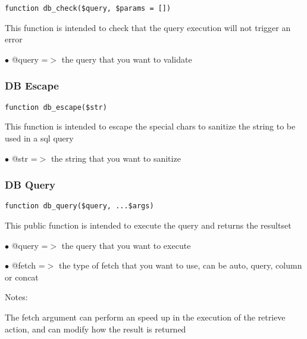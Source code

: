 \documentclass[a4paper]{article}
\begin{document}
\begin{lstlisting}
function db_check($query, $params = [])
\end{lstlisting}

This function is intended to check that the query execution will not trigger an error

\begin{compactitem}
\item[\color{myblue}$\bullet$] @query =$>$ the query that you want to validate
\end{compactitem}

\hypertarget{toc86}{}
\subsubsection{DB Escape}

\begin{lstlisting}
function db_escape($str)
\end{lstlisting}

This function is intended to escape the special chars to sanitize the string to be used
in a sql query

\begin{compactitem}
\item[\color{myblue}$\bullet$] @str =$>$ the string that you want to sanitize
\end{compactitem}

\hypertarget{toc87}{}
\subsubsection{DB Query}

\begin{lstlisting}
function db_query($query, ...$args)
\end{lstlisting}

This public function is intended to execute the query and returns the resultset

\begin{compactitem}
\item[\color{myblue}$\bullet$] @query =$>$ the query that you want to execute
\item[\color{myblue}$\bullet$] @fetch =$>$ the type of fetch that you want to use, can be auto, query, column or concat
\end{compactitem}

Notes:

The fetch argument can perform an speed up in the execution of the retrieve action, and
can modify how the result is returned
\end{document}
